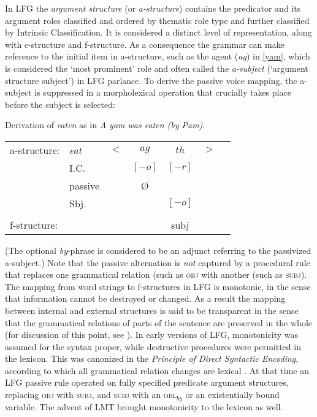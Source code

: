 In LFG the \textit{argument structure} (or \textit{a-structure}) contains the predicator and its argument roles classified and ordered by thematic role type and further classified by  Intrinsic Classification.  It is considered a distinct level of representation, along with c-structure and f-structure.  As a consequence the grammar can make reference to the initial item in a-structure, such as the agent (\textit{ag}) in \ref{yam}, which is considered the `most prominent' role and often called the \textit{a-subject} (`argument structure subject') in LFG parlance.  To derive the passive voice mapping, the a-subject is suppressed in a morpholexical operation that crucially takes place before the subject is selected:  

 \begin{exe}
\ex\label{yam2}{Derivation of \textit{eaten} as in \textit{A yam was eaten (by Pam)}.\\
\begin{tabular}[t]{lllccll}
a-structure: &{\it eat}& $<$& $ag$ & $th$   & $>$ & \\
             & I.C.      &    & $[-o]$ & $[-r]$   &   & \\
             & passive      &    & \O  &    &   & \\
             &  Sbj.     &    &  &       $[-o]$     &              & \\
             &       &    &    & \vline &    & \\
f-structure: &       &    & &{\sc subj} &   &
\end{tabular}
  }
\end{exe}
(The optional \textit{by}-phrase is considered to be an adjunct referring to the passivized a-subject.)  Note that the passive alternation is \textit{not} captured by a procedural rule that replaces one grammatical relation (such as \textsc{obj} with another (such as \textsc{subj}).   The mapping from word strings to f-structures in LFG is monotonic, in the sense that information cannot be destroyed or changed.  As a result the mapping between internal and external structures is said to be transparent in the sense that the grammatical relations of parts of the sentence are preserved in the whole (for discussion of this point, see \citet[chapter 5]{BATW2015a}).  In early versions of LFG, monotonicity was assumed for the syntax proper, while destructive procedures were permitted in the lexicon.  This was canonized in the \textit{Principle of Direct Syntactic Encoding}, according to which all grammatical relation changes are lexical \citep{Bresnan82a-ed}.  At that time an LFG passive rule operated on fully specified predicate argument structures, replacing \textsc{obj} with \textsc{subj}, and \textsc{subj} with an \textsc{obl$_{by}$} or an existentially bound variable.  The advent of LMT brought monotonicity to the lexicon as well.  


